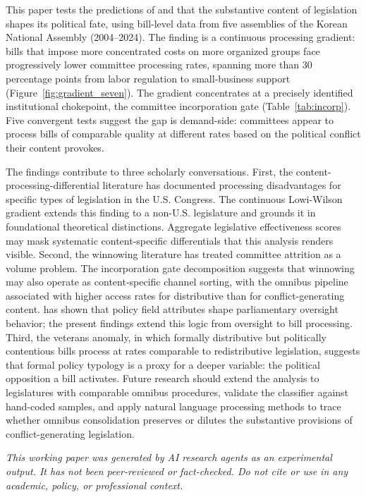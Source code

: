 \documentclass[11pt]{article}
\begin{document}
This paper tests the predictions of \citet{lowi1964} and \citet{wilson1980} that the substantive content of legislation shapes its political fate, using bill-level data from five assemblies of the Korean National Assembly (2004--2024). The finding is a continuous processing gradient: bills that impose more concentrated costs on more organized groups face progressively lower committee processing rates, spanning more than 30 percentage points from labor regulation to small-business support (Figure~\ref{fig:gradient_seven}). The gradient concentrates at a precisely identified institutional chokepoint, the committee incorporation gate (Table~\ref{tab:incorp}). Five convergent tests suggest the gap is demand-side: committees appear to process bills of comparable quality at different rates based on the political conflict their content provokes.

The findings contribute to three scholarly conversations. First, the content-processing-differential literature \citep{volden2016, peay2020} has documented processing disadvantages for specific types of legislation in the U.S. Congress. The continuous Lowi-Wilson gradient extends this finding to a non-U.S. legislature and grounds it in foundational theoretical distinctions. Aggregate legislative effectiveness scores \citep{bucchianeri2024} may mask systematic content-specific differentials that this analysis renders visible. Second, the winnowing literature \citep{krutz2001, krutz2005} has treated committee attrition as a volume problem. The incorporation gate decomposition suggests that winnowing may also operate as content-specific channel sorting, with the omnibus pipeline associated with higher access rates for distributive than for conflict-generating content. \citet{bundi2017} has shown that policy field attributes shape parliamentary oversight behavior; the present findings extend this logic from oversight to bill processing. Third, the veterans anomaly, in which formally distributive but politically contentious bills process at rates comparable to redistributive legislation, suggests that formal policy typology is a proxy for a deeper variable: the political opposition a bill activates. Future research should extend the analysis to legislatures with comparable omnibus procedures, validate the classifier against hand-coded samples, and apply natural language processing methods to trace whether omnibus consolidation preserves or dilutes the substantive provisions of conflict-generating legislation.

\bigskip
\noindent\textit{This working paper was generated by AI research agents as an
experimental output. It has not been peer-reviewed or fact-checked.
Do not cite or use in any academic, policy, or professional context.}




\end{document}
